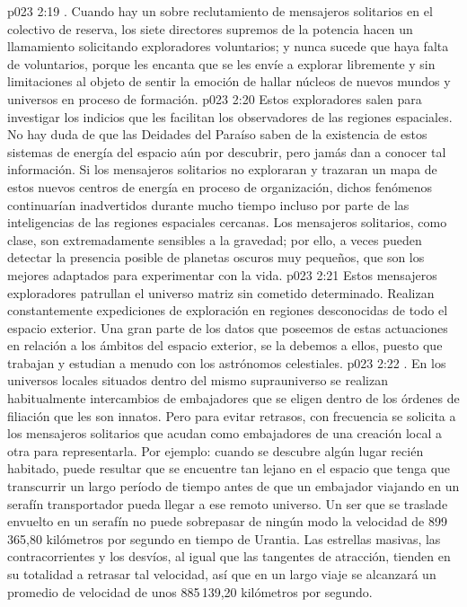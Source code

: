 \vs p023 2:19 . Cuando hay un sobre reclutamiento de mensajeros solitarios en el colectivo de reserva, los siete directores supremos de la potencia hacen un llamamiento solicitando exploradores voluntarios; y nunca sucede que haya falta de voluntarios, porque les encanta que se les envíe a explorar libremente y sin limitaciones al objeto de sentir la emoción de hallar núcleos de nuevos mundos y universos en proceso de formación.
\vs p023 2:20 Estos exploradores salen para investigar los indicios que les facilitan los observadores de las regiones espaciales. No hay duda de que las Deidades del Paraíso saben de la existencia de estos sistemas de energía del espacio aún por descubrir, pero jamás dan a conocer tal información. Si los mensajeros solitarios no exploraran y trazaran un mapa de estos nuevos centros de energía en proceso de organización, dichos fenómenos continuarían inadvertidos durante mucho tiempo incluso por parte de las inteligencias de las regiones espaciales cercanas. Los mensajeros solitarios, como clase, son extremadamente sensibles a la gravedad; por ello, a veces pueden detectar la presencia posible de planetas oscuros muy pequeños, que son los mejores adaptados para experimentar con la vida.
\vs p023 2:21 Estos mensajeros exploradores patrullan el universo matriz sin cometido determinado. Realizan constantemente expediciones de exploración en regiones desconocidas de todo el espacio exterior. Una gran parte de los datos que poseemos de estas actuaciones en relación a los ámbitos del espacio exterior, se la debemos a ellos, puesto que trabajan y estudian a menudo con los astrónomos celestiales.
\vs p023 2:22 . En los universos locales situados dentro del mismo suprauniverso se realizan habitualmente intercambios de embajadores que se eligen dentro de los órdenes de filiación que les son innatos. Pero para evitar retrasos, con frecuencia se solicita a los mensajeros solitarios que acudan como embajadores de una creación local a otra para representarla. Por ejemplo: cuando se descubre algún lugar recién habitado, puede resultar que se encuentre tan lejano en el espacio que tenga que transcurrir un largo período de tiempo antes de que un embajador viajando en un serafín transportador pueda llegar a ese remoto universo. Un ser que se traslade envuelto en un serafín no puede sobrepasar de ningún modo la velocidad de 899\,365,80 kilómetros por segundo en tiempo de Urantia. Las estrellas masivas, las contracorrientes y los desvíos, al igual que las tangentes de atracción, tienden en su totalidad a retrasar tal velocidad, así que en un largo viaje se alcanzará un promedio de velocidad de unos 885\,139,20 kilómetros por segundo.
